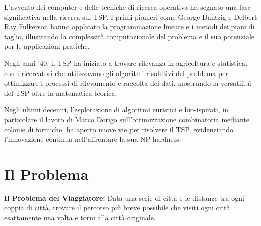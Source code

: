 L'avvento dei computer e delle tecniche di ricerca operativa ha segnato una fase significativa nella ricerca sul \gls{TSP}. I primi pionieri come George Dantzig e Delbert Ray Fulkerson hanno applicato la programmazione lineare e i metodi dei piani di taglio, illustrando la complessità computazionale del problema e il suo potenziale per le applicazioni pratiche.

Negli anni '40, il \gls{TSP} ha iniziato a trovare rilevanza in agricoltura e statistica, con i ricercatori che utilizzavano gli algoritmi risolutivi del problema per ottimizzare i processi di rilevamento e raccolta dei dati, mostrando la versatilità del \gls{TSP} oltre la matematica teorica.

Negli ultimi decenni, l'esplorazione di algoritmi euristici e bio-ispirati, in particolare il lavoro di Marco Dorigo sull'ottimizzazione combinatoria mediante colonie di formiche, ha aperto nuove vie per risolvere il \gls{TSP}, evidenziando l'innovazione continua nell'affrontare la sua NP-hardness.


\section{Il Problema}

\textbf{Il Problema del Viaggiatore:} Data una serie di città e le distanze tra ogni coppia di città, trovare il percorso più breve possibile che visiti ogni città esattamente una volta e torni alla città originale.



